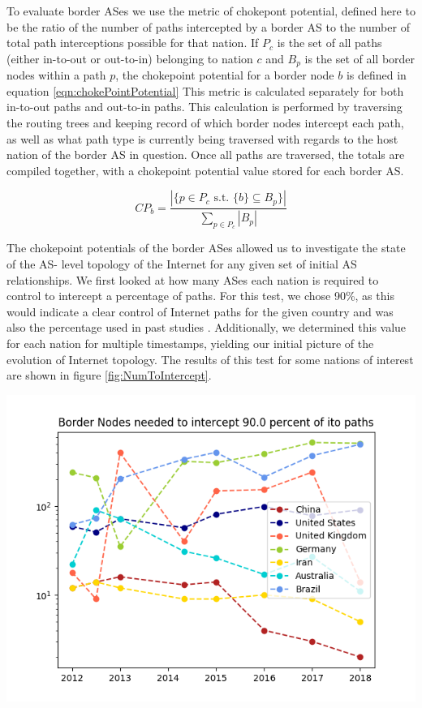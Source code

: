 \documentclass{article}
\newenvironment{Figure}
  {\par\medskip\noindent\minipage{\linewidth}}
  {\endminipage\par\medskip}
\begin{document}
\begin{multicols}{2}
\par To evaluate border ASes we use the metric of chokepont potential, defined here to be the
ratio of the number of paths intercepted by a border AS to the number of total path interceptions
possible for that nation. If $P_c$ is the set of all paths (either in-to-out or out-to-in) belonging to nation $c$ and 
$B_p$ is the set of all border nodes within a path $p$, the chokepoint potential for a border node $b$ is defined in equation \ref{eqn:chokePointPotential}
This metric is calculated separately for both in-to-out paths and out-to-in paths.
This calculation is performed by traversing the routing trees and keeping
record of which border nodes intercept each path, as well as what path type is
currently being traversed with regards to the host nation of the border AS in
question. Once all paths are traversed, the totals are compiled together, with
a chokepoint potential value stored for each border AS.

\begin{equation}\label{eqn:chokePointPotential}
CP_b = \frac{|\{p \in P_c \textrm{ s.t. } \{b\} \subseteq B_p\}|}{\sum_{p \in P_c}|B_p|}
\end{equation}

\par 
The chokepoint potentials of the border ASes allowed us to investigate the state of the AS-
level topology of the Internet for any given set of initial AS relationships.
We first looked at how many ASes each nation is required to control to
intercept a percentage of paths. For this test, we chose 90\%, as this would
indicate a clear control of Internet paths for the given country and was also
the percentage used in past studies \cite{throats}. Additionally, we determined this value
for each nation for multiple timestamps, yielding our initial picture of the
evolution of Internet topology. The results of this test for some nations of
interest are shown in figure \ref{fig:NumToIntercept}.

\begin{Figure}
	\centering
	\includegraphics[width=\linewidth]{NodesNeeded}
	\label{fig:NumToIntercept}
\end{Figure}


\end{multicols}
\end{document}
